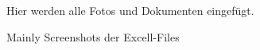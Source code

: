 %
%
%
%


Hier werden alle Fotos und Dokumenten eingefügt.


Mainly Screenshots der Excell-Files

%

